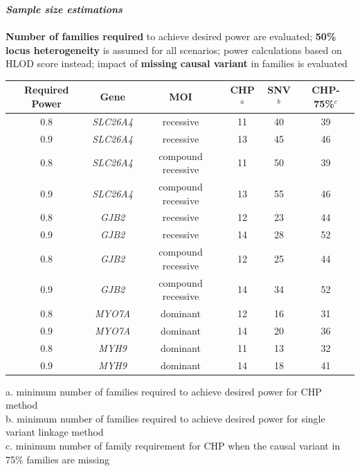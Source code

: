 \documentclass[ansiepaper, portrait, fontscale=0.35]{baposter} %
\newcommand{\hf}[1]{{\color{BaylorBurgundy}\textbf{#1}}}
\begin{document}
\begin{poster}
{\textbf{\textit{Sample size estimations}}\\\\\hf{Number of families required} to achieve desired power are evaluated; \hf{50\% locus heterogeneity} is assumed for all scenarios; power calculations based on HLOD score instead; impact of \hf{missing causal variant} in families is evaluated
\begin{center}
{\small \begin{longtable}{cccccc}
\hline
\textbf{Required Power}&\textbf{Gene}&\textbf{MOI}&\textbf{CHP}$^a$&\textbf{SNV}$^b$&\textbf{CHP-75}\%$^c$\\
\hline
0.8&\textsl{SLC26A4}&recessive&11&40&39\\
0.9&\textsl{SLC26A4}&recessive&13&45&46\\
0.8&\textsl{SLC26A4}&compound recessive&11&50&39\\
0.9&\textsl{SLC26A4}&compound recessive&13&55&46\\
0.8&\textsl{GJB2}&recessive&12&23&44\\
0.9&\textsl{GJB2}&recessive&14&28&52\\
0.8&\textsl{GJB2}&compound recessive&12&25&44\\
0.9&\textsl{GJB2}&compound recessive&14&34&52\\
0.8&\textsl{MYO7A}&dominant&12&16&31\\
0.9&\textsl{MYO7A}&dominant&14&20&36\\
0.8&\textsl{MYH9}&dominant&11&13&32\\
0.9&\textsl{MYH9}&dominant&14&18&41\\
\hline
\end{longtable}}
{\small a. minimum number of families required to achieve desired power for CHP method}\\
{\small b. minimum number of families required to achieve desired power for single variant linkage method}\\
{\small c. minimum number of family requirement for CHP when the causal variant in 75\% families are missing}
\end{center}
}
\end{poster}
\end{document}
